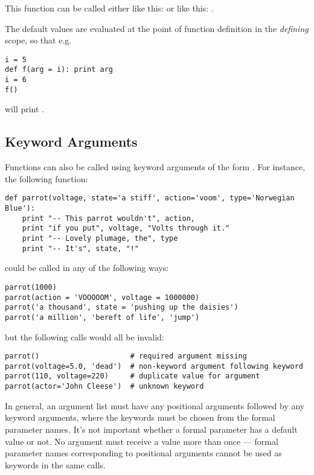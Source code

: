 \documentclass{manual}
\begin{document}
This function can be called either like this:
 or like this:
.

The default values are evaluated at the point of function definition
in the \emph{defining} scope, so that e.g.

\begin{verbatim}
i = 5
def f(arg = i): print arg
i = 6
f()
\end{verbatim}

will print .

\subsection{Keyword Arguments}
\label{keywordArgs}

Functions can also be called using
keyword arguments of the form .  For
instance, the following function:

\begin{verbatim}
def parrot(voltage, state='a stiff', action='voom', type='Norwegian Blue'):
    print "-- This parrot wouldn't", action,
    print "if you put", voltage, "Volts through it."
    print "-- Lovely plumage, the", type
    print "-- It's", state, "!"
\end{verbatim}

could be called in any of the following ways:

\begin{verbatim}
parrot(1000)
parrot(action = 'VOOOOOM', voltage = 1000000)
parrot('a thousand', state = 'pushing up the daisies')
parrot('a million', 'bereft of life', 'jump')
\end{verbatim}

but the following calls would all be invalid:

\begin{verbatim}
parrot()                     # required argument missing
parrot(voltage=5.0, 'dead')  # non-keyword argument following keyword
parrot(110, voltage=220)     # duplicate value for argument
parrot(actor='John Cleese')  # unknown keyword
\end{verbatim}

In general, an argument list must have any positional arguments
followed by any keyword arguments, where the keywords must be chosen
from the formal parameter names.  It's not important whether a formal
parameter has a default value or not.  No argument must receive a
value more than once --- formal parameter names corresponding to
positional arguments cannot be used as keywords in the same calls.
\end{document}
